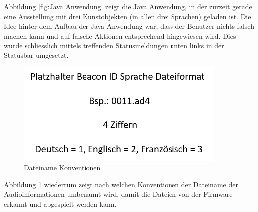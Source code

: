 Abbildung \ref{fig:Java Anwendung} zeigt die Java Anwendung, in der zurzeit gerade eine Ausstellung mit  drei Kunstobjekten (in allen drei Sprachen) geladen ist. Die Idee hinter dem Aufbau der Java Anwendung war, dass der Benutzer nichts falsch machen kann und auf falsche Aktionen entsprechend hingewiesen wird. Dies wurde schliesslich mittels treffenden Statusmeldungen unten links in der Statusbar umgesetzt.

\begin{figure}[htb]
	\centering
	\includegraphics[width=\textwidth, height=5cm]{graphics/Dateiname.png}
	\caption{Dateiname Konventionen}
	\label{fig:Dateiname Konventionen}
\end{figure}


Abbildung \ref{fig:Dateiname Konventionen} wiederrum zeigt nach welchen Konventionen der Dateiname der Audioinformationen umbenannt wird, damit die Dateien von der Firmware erkannt und abgespielt werden kann.
